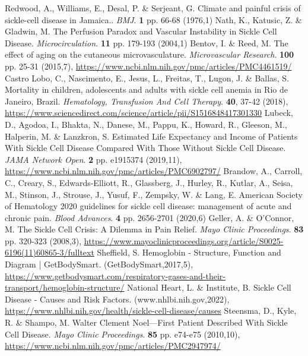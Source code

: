 \documentclass{mva_style}
\begin{document}
\begin{thebibliography}{99}
Redwood, A., Williams, E., Desal, P. \& Serjeant, G. Climate and painful crisis of sickle-cell disease in Jamaica.. {\em BMJ}. \textbf{1} pp. 66-68 (1976,1)
Nath, K., Katusic, Z. \& Gladwin, M. The Perfusion Paradox and Vascular Instability in Sickle Cell Disease. {\em Microcirculation}. \textbf{11} pp. 179-193 (2004,1)
Bentov, I. \& Reed, M. The effect of aging on the cutaneous microvasculature. {\em Microvascular Research}. \textbf{100} pp. 25-31 (2015,7), \url{https://www.ncbi.nlm.nih.gov/pmc/articles/PMC4461519/}
Castro Lobo, C., Nascimento, E., Jesus, L., Freitas, T., Lugon, J. \& Ballas, S. Mortality in children, adolescents and adults with sickle cell anemia in Rio de Janeiro, Brazil. {\em Hematology, Transfusion And Cell Therapy}. \textbf{40}, 37-42 (2018), \url{https://www.sciencedirect.com/science/article/pii/S1516848417301330}
Lubeck, D., Agodoa, I., Bhakta, N., Danese, M., Pappu, K., Howard, R., Gleeson, M., Halperin, M. \& Lanzkron, S. Estimated Life Expectancy and Income of Patients With Sickle Cell Disease Compared With Those Without Sickle Cell Disease. {\em JAMA Network Open}. \textbf{2} pp. e1915374 (2019,11), \url{https://www.ncbi.nlm.nih.gov/pmc/articles/PMC6902797/}
Brandow, A., Carroll, C., Creary, S., Edwards-Elliott, R., Glassberg, J., Hurley, R., Kutlar, A., Seisa, M., Stinson, J., Strouse, J., Yusuf, F., Zempsky, W. \& Lang, E. American Society of Hematology 2020 guidelines for sickle cell disease: management of acute and chronic pain. {\em Blood Advances}. \textbf{4} pp. 2656-2701 (2020,6)
Geller, A. \& O'Connor, M. The Sickle Cell Crisis: A Dilemma in Pain Relief. {\em Mayo Clinic Proceedings}. \textbf{83} pp. 320-323 (2008,3), \url{https://www.mayoclinicproceedings.org/article/S0025-6196(11)60865-3/fulltext}
Sheffield, S. Hemoglobin - Structure, Function and Diagram | GetBodySmart. (GetBodySmart,2017,5), \url{https://www.getbodysmart.com/respiratory-gases-and-their-transport/hemoglobin-structure/}
National Heart, L. \& Institute, B. Sickle Cell Disease - Causes and Risk Factors. (www.nhlbi.nih.gov,2022), \url{https://www.nhlbi.nih.gov/health/sickle-cell-disease/causes}
Steensma, D., Kyle, R. \& Shampo, M. Walter Clement Noel—First Patient Described With Sickle Cell Disease. {\em Mayo Clinic Proceedings}. \textbf{85} pp. e74-e75 (2010,10), \url{https://www.ncbi.nlm.nih.gov/pmc/articles/PMC2947974/}

\end{thebibliography}
\end{document}
